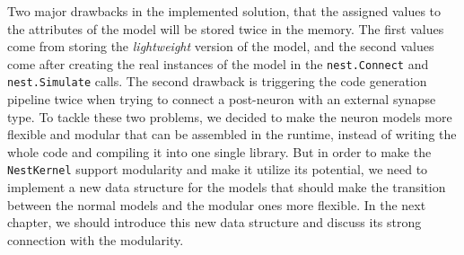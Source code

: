 Two major drawbacks in the implemented solution, that the assigned values to the attributes of the model will be stored twice in the memory. The first values come from storing the \emph{lightweight} version of the model, and the second values come after creating the real instances of the model in the \texttt{nest.Connect} and \texttt{nest.Simulate} calls. The second drawback is triggering the code generation pipeline twice when trying to connect a post-neuron with an external synapse type. To tackle these two problems, we decided to make the neuron models more flexible and modular that can be assembled in the runtime, instead of writing the whole code and compiling it into one single library. But in order to make the \texttt{NestKernel} support modularity and make it utilize its potential, we need to implement a new data structure for the models that should make the transition between the normal models and the modular ones more flexible. In the next chapter, we should introduce this new data structure and discuss its strong connection with the modularity.

